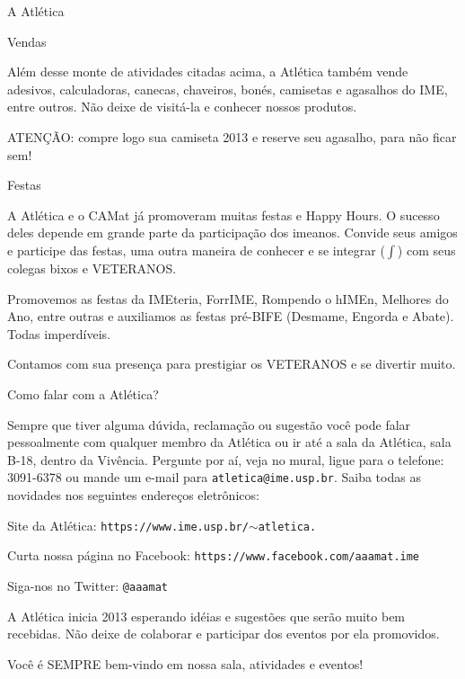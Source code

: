 \begin{secao}{A Atlética}
\begin{subsecao}{Vendas}

Além desse monte de atividades citadas acima, a Atlética também vende
adesivos, calculadoras, canecas, chaveiros, bonés, camisetas e agasalhos do IME,
 entre outros. Não deixe de visitá-la e conhecer nossos produtos.

ATENÇÃO: compre logo sua camiseta 2013 e reserve seu agasalho, para não ficar 
sem!

\end{subsecao}
\begin{subsecao}{Festas}

A Atlética e o CAMat já promoveram muitas festas e Happy Hours. O sucesso
deles depende em grande parte da participação dos imeanos. Convide seus
amigos e participe das festas, uma outra maneira de conhecer e se
integrar ($\int$) com seus colegas bixos e VETERANOS.

Promovemos as festas da IMEteria, ForrIME, Rompendo o hIMEn, Melhores do Ano, 
entre outras e auxiliamos as festas pré-BIFE (Desmame, Engorda e Abate). Todas 
imperdíveis.

Contamos com sua presença para prestigiar os VETERANOS e se divertir muito.

\end{subsecao}
\begin{subsecao}{Como falar com a Atlética?}

Sempre que tiver alguma dúvida, reclamação ou sugestão você pode falar
pessoalmente com qualquer membro da Atlética ou ir até a sala da Atlética, sala
B-18, dentro da Vivência. Pergunte por aí, veja no mural, ligue para o
telefone: 3091-6378 ou mande um e-mail para {\tt atletica@ime.usp.br}.
Saiba todas as novidades nos seguintes endereços eletrônicos:

Site da Atlética: {\tt https://www.ime.usp.br/$\sim$atletica.}

Curta nossa página no Facebook: {\tt https://www.facebook.com/aaamat.ime}

Siga-nos no Twitter: {\tt @aaamat}

A Atlética inicia 2013 esperando idéias e sugestões que serão muito bem
recebidas. Não deixe de colaborar e participar dos eventos por ela promovidos.

Você é SEMPRE bem-vindo em nossa sala, atividades e eventos!

\end{subsecao}
\end{secao}
